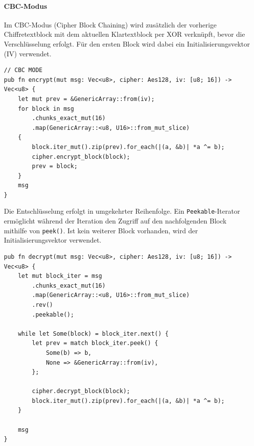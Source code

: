 \paragraph{CBC-Modus}
Im CBC-Modus (Cipher Block Chaining) wird zusätzlich der vorherige Chiffretextblock mit dem aktuellen Klartextblock per XOR verknüpft, bevor die Verschlüsselung erfolgt. Für den ersten Block wird dabei ein Initialisierungsvektor (IV) verwendet.
\begin{verbatim}
// CBC MODE
pub fn encrypt(mut msg: Vec<u8>, cipher: Aes128, iv: [u8; 16]) -> Vec<u8> {
    let mut prev = &GenericArray::from(iv);
    for block in msg
        .chunks_exact_mut(16)
        .map(GenericArray::<u8, U16>::from_mut_slice)
    {
        block.iter_mut().zip(prev).for_each(|(a, &b)| *a ^= b);
        cipher.encrypt_block(block);
        prev = block;
    }
    msg
}
\end{verbatim}
Die Entschlüsselung erfolgt in umgekehrter Reihenfolge. Ein \texttt{Peekable}-Iterator ermöglicht während der Iteration den Zugriff auf den nachfolgenden Block mithilfe von \texttt{peek()}. Ist kein weiterer Block vorhanden, wird der Initialisierungsvektor verwendet.
\begin{verbatim}
pub fn decrypt(mut msg: Vec<u8>, cipher: Aes128, iv: [u8; 16]) -> Vec<u8> {
    let mut block_iter = msg
        .chunks_exact_mut(16)
        .map(GenericArray::<u8, U16>::from_mut_slice)
        .rev()
        .peekable();

    while let Some(block) = block_iter.next() {
        let prev = match block_iter.peek() {
            Some(b) => b,
            None => &GenericArray::from(iv),
        };

        cipher.decrypt_block(block);
        block.iter_mut().zip(prev).for_each(|(a, &b)| *a ^= b);
    }

    msg
}
\end{verbatim} 
